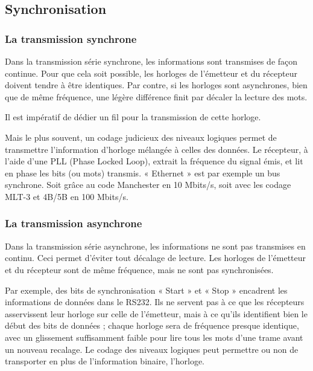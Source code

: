 \documentclass[10pt]{article}
\begin{document}
\subsection{Synchronisation}

\subsubsection*{La transmission synchrone}
Dans la transmission série synchrone, les informations sont transmises de façon continue. Pour que cela soit possible, les horloges de l’émetteur et du récepteur doivent tendre à être identiques. Par contre, si les horloges sont asynchrones, bien que de même fréquence, une légère différence finit par décaler la lecture des mots. 

Il est impératif de dédier un fil pour la transmission de cette horloge.

Mais le plus souvent, un codage judicieux des niveaux logiques permet de transmettre l’information d’horloge mélangée à celles des données. Le récepteur, à l’aide d’une PLL (Phase Locked Loop), extrait la fréquence du signal émis, et lit en phase les bits (ou mots) transmis.
« Ethernet » est par exemple un bus synchrone. Soit grâce au code Manchester en 10 Mbits/s, soit avec les codage MLT-3 et 4B/5B en 100 Mbits/s.

\subsubsection*{La transmission asynchrone}

Dans la transmission série asynchrone, les informations ne sont pas transmises en continu. Ceci permet d’éviter tout décalage de lecture. Les horloges de l’émetteur et du récepteur sont de même fréquence, mais ne sont pas synchronisées.

Par exemple, des bits de synchronisation « Start » et « Stop » encadrent les informations de données dans le RS232. Ils ne servent pas à ce que les récepteurs asservissent leur horloge sur celle de l’émetteur, mais à ce qu’ils identifient bien le début des bits de données ; chaque horloge sera de fréquence presque identique, avec un glissement suffisamment faible pour lire tous les mots d’une trame avant un nouveau recalage.
Le codage des niveaux logiques peut permettre ou non de transporter en plus de l’information binaire, l’horloge.
\end{document}
